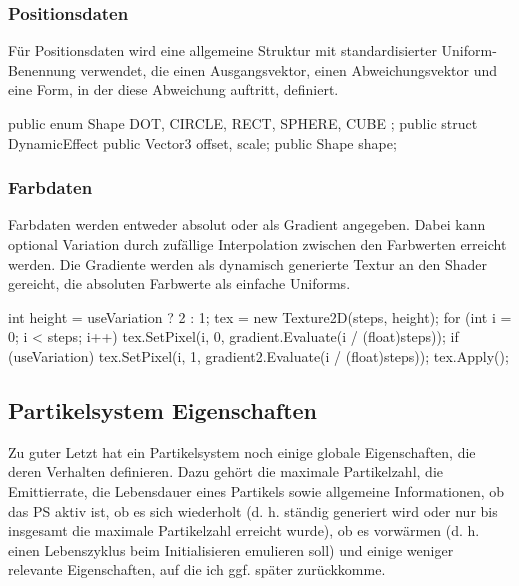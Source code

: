 \subsubsection{Positionsdaten}

Für Positionsdaten wird eine allgemeine Struktur mit standardisierter Uniform-Benennung verwendet, die einen Ausgangsvektor, einen Abweichungsvektor und eine Form, in der diese Abweichung auftritt, definiert.

\begin{csh}[caption=DynamicEffect Struktur]
public enum Shape { DOT, CIRCLE, RECT, SPHERE, CUBE };
public struct DynamicEffect
{
    public Vector3 offset, scale;
    public Shape shape;
}
\end{csh}



\subsubsection{Farbdaten}

Farbdaten werden entweder absolut oder als Gradient angegeben. Dabei kann optional Variation durch zufällige Interpolation zwischen den Farbwerten erreicht werden. Die Gradiente werden als dynamisch generierte Textur an den Shader gereicht, die absoluten Farbwerte als einfache Uniforms.

\begin{csh}[caption=Generierung der Gradient-Textur]
int height = useVariation ? 2 : 1;
tex = new Texture2D(steps, height);
for (int i = 0; i < steps; i++)
{
    tex.SetPixel(i, 0, gradient.Evaluate(i / (float)steps));
    if (useVariation) tex.SetPixel(i, 1, gradient2.Evaluate(i / (float)steps));
}
tex.Apply();
\end{csh}



\subsection{Partikelsystem Eigenschaften}

Zu guter Letzt hat ein Partikelsystem noch einige globale Eigenschaften, die deren Verhalten definieren. Dazu gehört die maximale Partikelzahl, die Emittierrate, die Lebensdauer eines Partikels sowie allgemeine Informationen, ob das PS aktiv ist, ob es sich wiederholt (d. h. ständig generiert wird oder nur bis insgesamt die maximale Partikelzahl erreicht wurde), ob es vorwärmen (d. h. einen Lebenszyklus beim Initialisieren emulieren soll) und einige weniger relevante Eigenschaften, auf die ich ggf. später zurückkomme.


